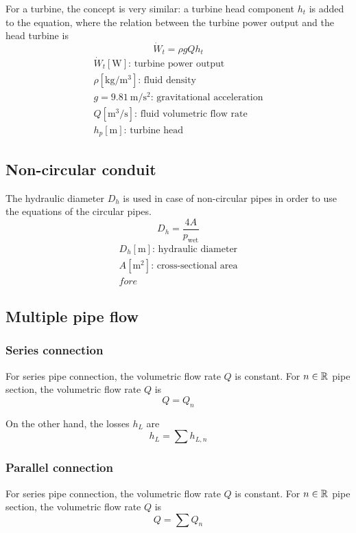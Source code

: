 \documentclass[10pt, twocolumn]{article}
\begin{document}
For a turbine, the concept is very similar: a turbine head component \(h_t\) is added to the equation, where the relation between the turbine power output and the head turbine is
\[
  \dot{W}_t = \rho g Q h_t
\]
\[
  \begin{array}{|l}
    \dot{W}_t [\si{\watt}] \text{: turbine power output}                         \\
    \rho [\si{\kilogram\per\metre\cubed}] \text{: fluid density}                 \\
    g = \SI{9.81}{\metre\per\second\squared} \text{: gravitational acceleration} \\
    Q [\si{\metre\cubed\per\second}] \text{: fluid volumetric flow rate}         \\
    h_p [\si{\metre}] \text{: turbine head}
  \end{array}
\]


\subsection{Non-circular conduit}
The hydraulic diameter \(D_h\) is used in case of non-circular pipes in order to use the equations of the circular pipes.
\[
  D_h = \frac{4A}{p_\mathrm{wet}}
\]
\[
  \begin{array}{|l}
    D_h [\si{\metre}] \text{: hydraulic diameter}         \\
    A [\si{\metre\squared}] \text{: cross-sectional area} \\
    fore
  \end{array}
\]


\subsection{Multiple pipe flow}
\subsubsection{Series connection}
For series pipe connection, the volumetric flow rate \(Q\) is constant.
For \(n \in \mathbb{R}_{}^{}\) pipe section, the volumetric flow rate \(Q\) is
\[
  Q = Q_n
\]

On the other hand, the losses \(h_L\) are
\[
  h_L = \sum{h_{L,n}}
\]


\subsubsection{Parallel connection}
For series pipe connection, the volumetric flow rate \(Q\) is constant.
For \(n \in \mathbb{R}_{}^{}\) pipe section, the volumetric flow rate \(Q\) is
\[
  Q = \sum{Q_n}
\]
\end{document}
